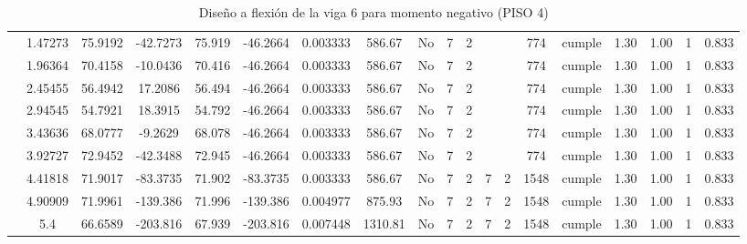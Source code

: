 \begin{table}[H]
{\begin{tabular}{|c|c|c|c|c|c|r|c|c|c|c|c|c|c|c|c|c|c|c|}
\cline{2-19}        & 1.47273 & 75.9192 & -42.7273 & 75.919 & -46.2664 & 0.003333 & 586.67 & No  & 7   & 2   &     &     & 774 & \cellcolor[rgb]{ .776,  .937,  .808}cumple & 1.30 & 1.00 & 1   & 0.833 \bigstrut\\
\cline{2-19}        & 1.96364 & 70.4158 & -10.0436 & 70.416 & -46.2664 & 0.003333 & 586.67 & No  & 7   & 2   &     &     & 774 & \cellcolor[rgb]{ .776,  .937,  .808}cumple & 1.30 & 1.00 & 1   & 0.833 \bigstrut\\
\cline{2-19}        & 2.45455 & 56.4942 & 17.2086 & 56.494 & -46.2664 & 0.003333 & 586.67 & No  & 7   & 2   &     &     & 774 & \cellcolor[rgb]{ .776,  .937,  .808}cumple & 1.30 & 1.00 & 1   & 0.833 \bigstrut\\
\cline{2-19}        & 2.94545 & 54.7921 & 18.3915 & 54.792 & -46.2664 & 0.003333 & 586.67 & No  & 7   & 2   &     &     & 774 & \cellcolor[rgb]{ .776,  .937,  .808}cumple & 1.30 & 1.00 & 1   & 0.833 \bigstrut\\
\cline{2-19}        & 3.43636 & 68.0777 & -9.2629 & 68.078 & -46.2664 & 0.003333 & 586.67 & No  & 7   & 2   &     &     & 774 & \cellcolor[rgb]{ .776,  .937,  .808}cumple & 1.30 & 1.00 & 1   & 0.833 \bigstrut\\
\cline{2-19}        & 3.92727 & 72.9452 & -42.3488 & 72.945 & -46.2664 & 0.003333 & 586.67 & No  & 7   & 2   &     &     & 774 & \cellcolor[rgb]{ .776,  .937,  .808}cumple & 1.30 & 1.00 & 1   & 0.833 \bigstrut\\
\cline{2-19}        & 4.41818 & 71.9017 & -83.3735 & 71.902 & -83.3735 & 0.003333 & 586.67 & No  & 7   & 2   & 7   & 2   & 1548 & \cellcolor[rgb]{ .776,  .937,  .808}cumple & 1.30 & 1.00 & 1   & 0.833 \bigstrut\\
\cline{2-19}        & 4.90909 & 71.9961 & -139.386 & 71.996 & -139.386 & 0.004977 & 875.93 & No  & 7   & 2   & 7   & 2   & 1548 & \cellcolor[rgb]{ .776,  .937,  .808}cumple & 1.30 & 1.00 & 1   & 0.833 \bigstrut\\
\cline{2-19}        & 5.4 & 66.6589 & -203.816 & 67.939 & -203.816 & 0.007448 & 1310.81 & No  & 7   & 2   & 7   & 2   & 1548 & \cellcolor[rgb]{ .776,  .937,  .808}cumple & 1.30 & 1.00 & 1   & 0.833 \bigstrut\\
    \hline
    \end{tabular}%
  
    
  }
      \caption{Diseño a flexión de la viga 6 para momento negativo (PISO 4) }
  \label{tab:F VG6 P4 M-}%
\end{table}%
